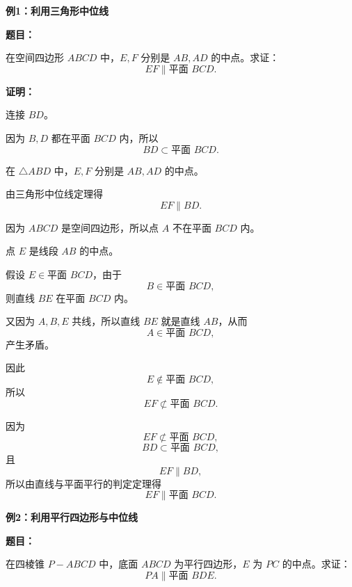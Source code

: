 \begin{examplebox}
	\textbf{\textcolor{CExample}{例1：利用三角形中位线}}

	\textbf{题目：}

	在空间四边形 $ABCD$ 中，$E,F$ 分别是 $AB,AD$ 的中点。求证：
	\[
		EF\parallel\text{平面 }BCD.
	\]

	\textbf{证明：}

	\begin{description}[
			style=nextline,
			leftmargin=2.8em,
			labelsep=0.5em,
			itemsep=0.45em
		]
		\item[\textbf{第一步（寻找面内参照线）：}]
		      连接 $BD$。

		      因为 $B,D$ 都在平面 $BCD$ 内，所以
		      \[
			      BD\subset\text{平面 }BCD.
		      \]

		\item[\textbf{第二步（证明线线平行）：}]
		      在 $\triangle ABD$ 中，$E,F$ 分别是 $AB,AD$ 的中点。

		      由三角形中位线定理得
		      \[
			      EF\parallel BD.
		      \]

		\item[\textbf{第三步（确认目标线不在平面内）：}]
		      因为 $ABCD$ 是空间四边形，所以点 $A$ 不在平面 $BCD$ 内。

		      点 $E$ 是线段 $AB$ 的中点。

		      假设 $E\in\text{平面 }BCD$，由于
		      \[
			      B\in\text{平面 }BCD,
		      \]
		      则直线 $BE$ 在平面 $BCD$ 内。

		      又因为 $A,B,E$ 共线，所以直线 $BE$ 就是直线 $AB$，从而
		      \[
			      A\in\text{平面 }BCD,
		      \]
		      产生矛盾。

		      因此
		      \[
			      E\notin\text{平面 }BCD,
		      \]
		      所以
		      \[
			      EF\not\subset\text{平面 }BCD.
		      \]

		\item[\textbf{第四步（套用判定定理）：}]
		      因为
		      \[
			      EF\not\subset\text{平面 }BCD,
		      \]
		      \[
			      BD\subset\text{平面 }BCD,
		      \]
		      且
		      \[
			      EF\parallel BD,
		      \]
		      所以由直线与平面平行的判定定理得
		      \[
			      EF\parallel\text{平面 }BCD.
		      \]
	\end{description}

	\medskip
	\textbf{\textcolor{CExample}{例2：利用平行四边形与中位线}}

	\textbf{题目：}

	在四棱锥 $P-ABCD$ 中，底面 $ABCD$ 为平行四边形，$E$ 为 $PC$ 的中点。求证：
	\[
		PA\parallel\text{平面 }BDE.
	\]


\end{examplebox}
